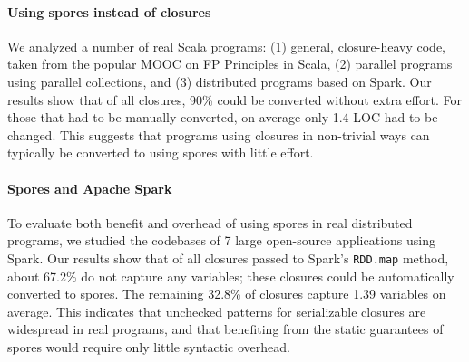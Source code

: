 \documentclass[english]{lni}
\begin{document}
\vspace{-5mm}
\paragraph{Using spores instead of closures}
We analyzed a number of real Scala programs: (1) general, closure-heavy
code, taken from the popular MOOC on
FP Principles in Scala, (2) parallel programs using parallel
collections, and (3) distributed programs based on Spark. Our
results show that of all closures, 90\% could be converted without extra
effort. For those that had to be manually converted, on average only 1.4 LOC
had to be changed. This suggests that programs using closures in non-trivial
ways can typically be converted to using spores with little effort.

\vspace{-5mm}
\paragraph{Spores and Apache Spark}
To evaluate both benefit and overhead of using spores in real distributed
programs, we studied the codebases of 7 large open-source
applications using Spark. Our results show that of all closures
passed to Spark's \verb|RDD.map| method, about 67.2\% do not capture any
variables; these closures could be automatically converted to spores. The
remaining 32.8\% of closures capture
1.39 variables on average. This indicates that unchecked patterns for
serializable closures are widespread in real programs, and that benefiting
from the static guarantees of spores would require only little syntactic overhead.

% 
\end{document}
